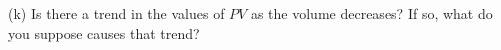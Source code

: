 \vspace{12cm}

(k) Is there a trend in the values of $PV$ as the volume decreases? If so, 
what do you suppose causes that trend?







